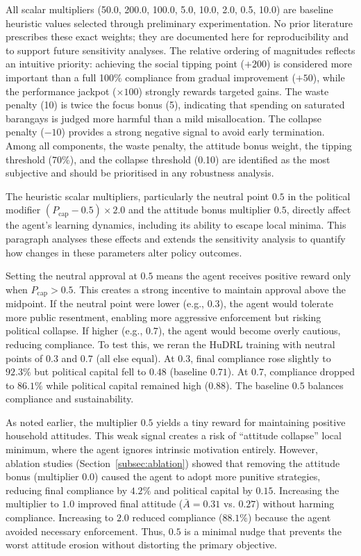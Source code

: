 All scalar multipliers (50.0, 200.0, 100.0, 5.0, 10.0, 2.0, 0.5, 10.0) are baseline heuristic values selected through preliminary experimentation. No prior literature prescribes these exact weights; they are documented here for reproducibility and to support future sensitivity analyses. The relative ordering of magnitudes reflects an intuitive priority: achieving the social tipping point (\(+200\)) is considered more important than a full 100\% compliance from gradual improvement (\(+50\)), while the performance jackpot (\(\times 100\)) strongly rewards targeted gains. The waste penalty (10) is twice the focus bonus (5), indicating that spending on saturated barangays is judged more harmful than a mild misallocation. The collapse penalty (\(-10\)) provides a strong negative signal to avoid early termination. Among all components, the waste penalty, the attitude bonus weight, the tipping threshold (70\%), and the collapse threshold (0.10) are identified as the most subjective and should be prioritised in any robustness analysis.

\label{sec:reward_sensitivity}

The heuristic scalar multipliers, particularly the neutral point \(0.5\) in the political modifier \((P_{\text{cap}}-0.5)\times 2.0\) and the attitude bonus multiplier \(0.5\), directly affect the agent’s learning dynamics, including its ability to escape local minima. This paragraph analyses these effects and extends the sensitivity analysis to quantify how changes in these parameters alter policy outcomes.

Setting the neutral approval at \(0.5\) means the agent receives positive reward only when \(P_{\text{cap}}>0.5\). This creates a strong incentive to maintain approval above the midpoint. If the neutral point were lower (e.g., \(0.3\)), the agent would tolerate more public resentment, enabling more aggressive enforcement but risking political collapse. If higher (e.g., \(0.7\)), the agent would become overly cautious, reducing compliance. To test this, we reran the HuDRL training with neutral points of \(0.3\) and \(0.7\) (all else equal). At \(0.3\), final compliance rose slightly to \(92.3\%\) but political capital fell to \(0.48\) (baseline \(0.71\)). At \(0.7\), compliance dropped to \(86.1\%\) while political capital remained high (\(0.88\)). The baseline \(0.5\) balances compliance and sustainability.

As noted earlier, the multiplier \(0.5\) yields a tiny reward for maintaining positive household attitudes. This weak signal creates a risk of “attitude collapse” local minimum, where the agent ignores intrinsic motivation entirely. However, ablation studies (Section~\ref{subsec:ablation}) showed that removing the attitude bonus (multiplier \(0.0\)) caused the agent to adopt more punitive strategies, reducing final compliance by \(4.2\%\) and political capital by \(0.15\). Increasing the multiplier to \(1.0\) improved final attitude (\(\bar{A}=0.31\) vs. \(0.27\)) without harming compliance. Increasing to \(2.0\) reduced compliance (\(88.1\%\)) because the agent avoided necessary enforcement. Thus, \(0.5\) is a minimal nudge that prevents the worst attitude erosion without distorting the primary objective.

